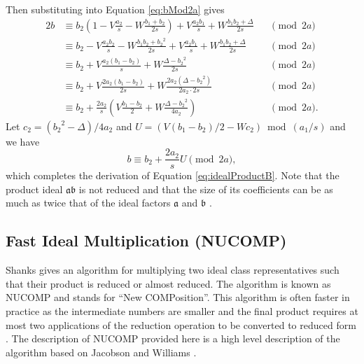 \documentclass{ucalgthes1}
\theoremstyle{definition}
\begin{document}
\noindent
Then substituting into Equation \eqref{eq:bMod2a} gives
\begin{alignat*}{2}
	b & \equiv b_2(1-V\frac{a_2}{s} - W\frac{b_1+b_2}{2s}) + V\frac{a_2b_1}{s} + W\frac{b_1b_2 + \Delta}{2s} && \pmod{2a} \\
	& \equiv b_2 - V\frac{a_2b_2}{s} - W\frac{b_1b_2+{b_2}^2}{2s} + V\frac{a_2b_1}{s} + W\frac{b_1b_2 + \Delta}{2s} && \pmod{2a} \\
	& \equiv b_2 + V\frac{a_2(b_1-b_2)}{s} + W\frac{\Delta - {b_2}^2}{2s} && \pmod{2a} \\
	& \equiv b_2 + V\frac{2a_2(b_1-b_2)}{2s} + W\frac{2a_2(\Delta - {b_2}^2)}{2a_2 \cdot 2s} && \pmod{2a} \\
	& \equiv b_2 + \frac{2a_2}{s} \left( V\frac{b_1-b_2}{2} + W\frac{\Delta - {b_2}^2}{4a_2} \right) && \pmod{2a}.
\end{alignat*}
Let $c_2 = ({b_2}^2 - \Delta)/4a_2$ and $U = (V(b_1-b_2)/2 - Wc_2) \bmod{(a_1/s)}$ and we have
\[
	b \equiv b_2 + \frac{2a_2}{s} U \pmod{2a},
\]
which completes the derivation of Equation \ref{eq:idealProductB}.  Note that the product ideal $\mathfrak a \mathfrak b$ is not reduced and that the size of its coefficients can be as much as twice that of the ideal factors $\mathfrak a$ and $\mathfrak b$ \cite[p.118]{Jacobson2009}.


\subsection{Fast Ideal Multiplication (NUCOMP)}
\label{subsec:nucomp}

Shanks \cite{Shanks1989} gives an algorithm for multiplying two ideal class representatives such that their product is reduced or almost reduced.  The algorithm is known as NUCOMP and stands for ``New COMPosition''.  This algorithm is often faster in practice as the intermediate numbers are smaller and the final product requires at most two applications of the reduction operation to be converted to reduced form \cite[pp.439--441]{Jacobson2009}. The description of NUCOMP provided here is a high level description of the algorithm based on Jacobson and Williams \mbox{\cite[\S 5.4,~pp. 119-123]{Jacobson2009}}.
\end{document}
